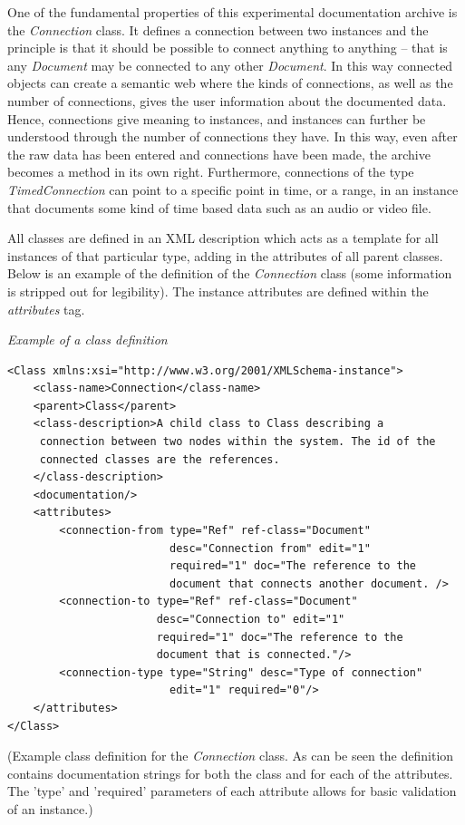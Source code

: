 \documentclass[,a4paper]{llncs}
\begin{document}
One of the fundamental properties of this experimental documentation archive is the \emph{Connection} class. It defines a connection between two instances and the principle is that it should be possible to connect anything to anything -- that is any \emph{Document} may be connected to any other \emph{Document}. In this way connected objects can create a semantic web where the kinds of connections, as well as the number of connections, gives the user information about the documented data. Hence, connections give meaning to instances, and instances can further be understood through the number of connections they have. In this way, even after the raw data has been entered and connections have been made, the archive becomes a method in its own right. Furthermore, connections of the type \emph{TimedConnection} can point to a specific point in time, or a range, in an instance that documents some kind of time based data such as an audio or video file.

All classes are defined in an XML description which acts as a template for all instances of that particular type, adding in the attributes of all parent classes. Below is an example of the definition of the \emph{Connection} class (some information is stripped out for legibility). The instance attributes are defined within the \emph{attributes} tag.
\medskip

\noindent
{\it Example of a class definition}
\begin{verbatim}
<Class xmlns:xsi="http://www.w3.org/2001/XMLSchema-instance">
    <class-name>Connection</class-name>
    <parent>Class</parent>
    <class-description>A child class to Class describing a 
     connection between two nodes within the system. The id of the 
     connected classes are the references.
    </class-description>
    <documentation/>
    <attributes>
        <connection-from type="Ref" ref-class="Document" 
                         desc="Connection from" edit="1" 
                         required="1" doc="The reference to the 
                         document that connects another document. />
        <connection-to type="Ref" ref-class="Document" 
                       desc="Connection to" edit="1" 
                       required="1" doc="The reference to the 
                       document that is connected."/>
        <connection-type type="String" desc="Type of connection" 
                         edit="1" required="0"/>
    </attributes>
</Class>
\end{verbatim}
\noindent
{\small (Example class definition for the \emph{Connection} class. As can be seen the definition contains documentation strings for both the class and for each of the attributes. The 'type' and 'required' parameters of each attribute allows for basic validation of an instance.)}
\end{document}

